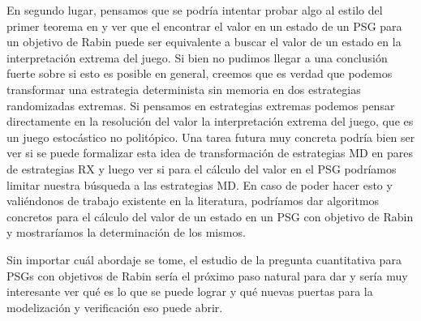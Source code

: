 En segundo lugar, pensamos que se podría intentar probar algo al estilo del primer teorema en \cite{Polytopal} y ver que el encontrar el valor en un estado de un PSG para un objetivo de Rabin puede ser equivalente a buscar el valor de un estado en la interpretación extrema del juego. Si bien no pudimos llegar a una conclusión fuerte sobre si esto es posible en general, creemos que es verdad que podemos transformar una estrategia determinista sin memoria en dos estrategias randomizadas extremas. Si pensamos en estrategias extremas podemos pensar directamente en la resolución del valor la interpretación extrema del juego, que es un juego estocástico no politópico. Una tarea futura muy concreta podría bien ser ver si se puede formalizar esta idea de transformación de estrategias MD en pares de estrategias RX y luego ver si para el cálculo del valor en el PSG podríamos limitar nuestra búsqueda a las estrategias MD.  En caso de poder hacer esto y valiéndonos de trabajo existente en la literatura, podríamos dar algoritmos concretos para el cálculo del valor de un estado en un PSG con objetivo de Rabin y mostraríamos la determinación de los mismos. %

Sin importar cuál abordaje se tome, el estudio de la pregunta cuantitativa para PSGs con objetivos de Rabin sería el próximo paso natural para dar y sería muy interesante ver qué es lo que se puede lograr y qué nuevas puertas para la modelización y verificación eso puede abrir.